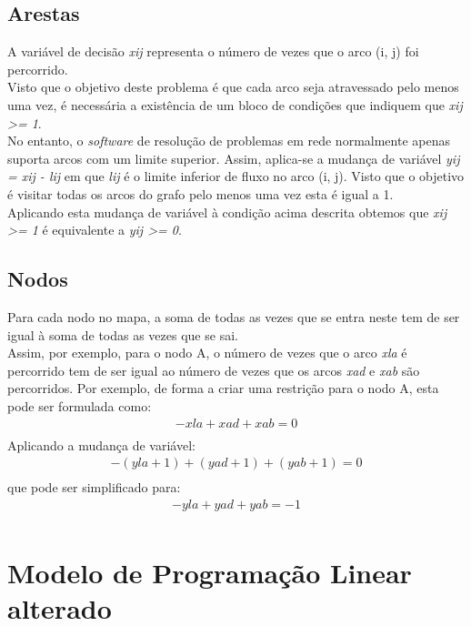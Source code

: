 \documentclass[a4paper]{report}
\begin{document}
\subsection{Arestas}
A variável de decisão \textit{xij} representa o número de vezes que o arco (i,
j) foi percorrido.\\
Visto que o objetivo deste problema é que cada arco seja atravessado pelo menos
uma vez, é necessária a existência de um bloco de condições que indiquem que
\textit{xij \textgreater= 1}.\\
No entanto, o \textit{software} de resolução de problemas em rede normalmente
apenas suporta arcos com um limite superior. Assim, aplica-se a mudança de
variável \textit{yij = xij - lij} em que \textit{lij} é o limite inferior de
fluxo no arco (i, j). Visto que o objetivo é visitar todas os arcos do grafo
pelo menos uma vez esta é igual a 1.\\
Aplicando esta mudança de variável à condição acima descrita obtemos que
\textit{xij \textgreater= 1} é equivalente a \textit{yij \textgreater= 0}.

\subsection{Nodos}
Para cada nodo no mapa, a soma de todas as vezes que se entra neste
tem de ser igual à soma de todas as vezes que se sai.\\
Assim, por exemplo, para o nodo A, o número de vezes que o arco \textit{xla} é
percorrido tem de ser igual ao número de vezes que os arcos \textit{xad} e
\textit{xab} são percorridos.
Por exemplo, de forma a criar uma restrição para o nodo A, esta pode ser
formulada como:\\
\begin{multline}
- xla + xad + xab = 0 \\
\end{multline}
Aplicando a mudança de variável:
\begin{multline}
- (yla + 1) + (yad +1) + (yab +1) = 0 \\
\end{multline}
que pode ser simplificado para:
\begin{multline}
- yla + yad + yab = -1\\
\end{multline}

\pagebreak
\section{Modelo de Programação Linear alterado}

\end{document}
